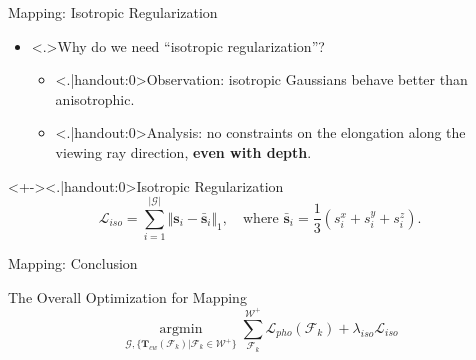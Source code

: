 \begin{Frame}{Mapping: Isotropic Regularization}
	\begin{itemize}
		\setlength{\itemsep}{1.5ex}
		\item<+-> \alert<.>{Why} do we need ``isotropic regularization''?
			\vspace*{1.5ex}
			\begin{itemize}
				\setlength{\itemsep}{1.5ex}
				\item<+-> \alert<.|handout:0>{Observation:} isotropic Gaussians behave better than anisotrophic.
				\item<+-> \alert<.|handout:0>{Analysis:} no constraints on the elongation along the viewing ray direction, \textbf{even with depth}.
			\end{itemize}
	\end{itemize}
	\vspace*{\fill}
	\begin{block}<+->{\alert<.|handout:0>{Isotropic Regularization}}
		\vspace*{0.5ex}
		\begin{equation}
			\mathcal{L}_{iso} = \sum_{i=1}^{\vert \mathcal{G} \vert} \Vert \mathbf{s}_i - \bar{\mathbf{s}}_i \Vert_1, \quad\text{where } \bar{\mathbf{s}}_i = \frac{1}{3} \left( s_i^{x} + s_i^{y} + s_i^{z} \right).
		\end{equation}
	\end{block}
\end{Frame}

\begin{Frame}{Mapping: Conclusion}
	\begin{block}{The Overall Optimization for Mapping}
		\begin{equation}
			\underset{\mathcal{G}, \{\mathbf{T}_{cw}({\mathcal{F}_k})\vert \mathcal{F}_k\in \mathcal{W}^{+}\}}{\operatorname{argmin}} \sum_{\mathcal{F}_k}^{\mathcal{W}^{+}} \mathcal{L}_{pho}\left({\mathcal{F}_k}\right) + \lambda_{iso} \mathcal{L}_{iso}
		\end{equation}
	\end{block}
\end{Frame}
